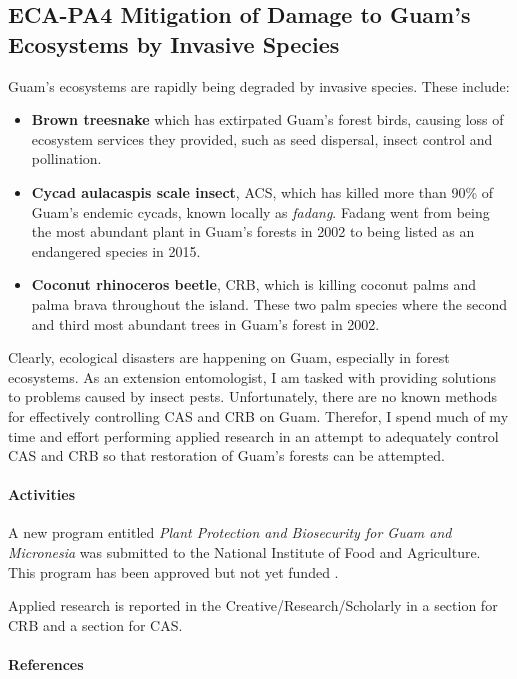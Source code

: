 \subsection{ECA-PA4 Mitigation of Damage to Guam's Ecosystems by Invasive Species}
\begin{refsection}

Guam's ecosystems are rapidly being degraded by invasive species. These include:
\begin{itemize}
	\item \textbf{Brown treesnake} which has extirpated Guam's forest birds, causing loss of ecosystem services they provided, such as seed dispersal, insect control and pollination.
	\item \textbf{Cycad aulacaspis scale insect}, ACS, which has killed more than 90\% of Guam's endemic cycads, known locally as \textit{fadang}. Fadang went from being the most abundant plant in Guam's forests in 2002 to being listed as an endangered species in 2015.
	\item \textbf{Coconut rhinoceros beetle}, CRB, which is killing coconut palms and palma brava throughout the island. These two palm species where the second and third most abundant trees in Guam's forest in 2002. 
\end{itemize}

Clearly, ecological disasters are happening on Guam, especially in forest ecosystems. As an extension entomologist, I am tasked with providing solutions to problems caused by insect pests. Unfortunately, there are no known methods for effectively controlling CAS and CRB on Guam. Therefor, I spend much of my time and effort performing applied research in an attempt to adequately control CAS and CRB so that restoration of Guam's forests can be attempted. 

\paragraph{Activities}

A new program entitled \textit{Plant Protection and Biosecurity for Guam and Micronesia} was submitted to the National Institute of Food and Agriculture. This program has been approved but not yet funded \cite{NIFA2022}.

Applied research is reported  in the Creative/Research/Scholarly in a section for CRB and a section for CAS.

\paragraph{References}
\printbibliography[heading=none]
\end{refsection}


